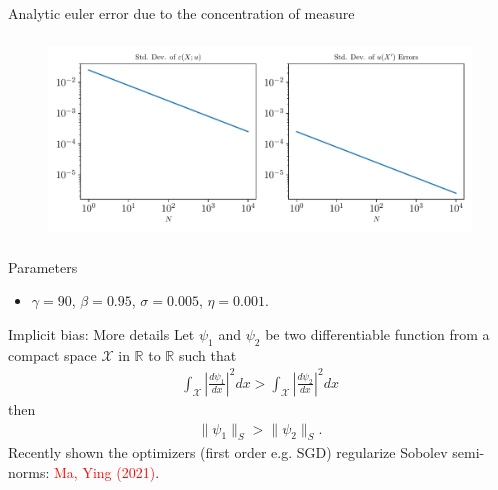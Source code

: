 \documentclass[aspectratio=169,10pt]{beamer}
\begin{document}
\begin{frame}{Analytic euler error due to the concentration of measure}
	
	\begin{figure}[h!]
		\centering
		\includegraphics[height = 2.1in]{./figures/concentration_euler_residual_linear.pdf}
	\end{figure}
\end{frame}		





\begin{frame}{Parameters}
	\begin{itemize}
		\item $\gamma = 90$, $\beta = 0.95$, $\sigma = 0.005$, $\eta = 0.001$.
	\end{itemize}
\end{frame}

\begin{frame}{Implicit bias: More details}
	\label{sobolev}
	Let $\psi_1$ and $\psi_2$ be two differentiable function from a compact space $\mathcal{X}$ in $\mathbb{R}$ to $\mathbb{R}$ such that
	\begin{align*}
		\int_\mathcal{X}\left|\frac{d \psi_1}{dx}\right|^2 dx >   \int_\mathcal{X}\left|\frac{d \psi_2}{dx}\right|^2 dx
	\end{align*}
	then
	\begin{align*}
		\|\psi_1\|_S > \|\psi_2\|_S.
	\end{align*}
	Recently shown the optimizers (first order e.g. SGD) regularize Sobolev semi-norms: \textcolor{red}{Ma, Ying (2021)}.
\hyperlink{implicit}{}
\end{frame}
\end{document}
